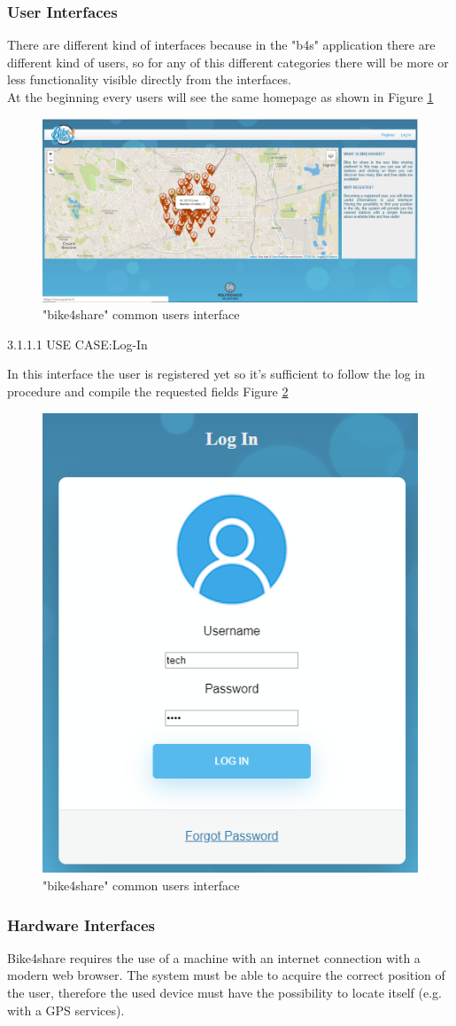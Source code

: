 \documentclass{article}
\begin{document}
\subsubsection{User Interfaces}
There are different kind of interfaces because in the "b4s" application there are different kind of users, so for any of this different categories there will be more or less functionality visible directly from the interfaces.\\
At the beginning every users will see the same homepage as shown in Figure \ref{fig:homepage}\\
\begin{figure}[H]
    \centering
    \includegraphics[width=0.75\linewidth]{image/all.PNG}
    \caption{"bike4share" common users interface}
    \label{fig:homepage}
\end{figure}

3.1.1.1 USE CASE:Log-In

In this interface the user is registered yet so it's sufficient to follow the log in procedure and compile the requested fields Figure \ref{fig:log-in 2}
\begin{figure}[H]
    \centering
    \includegraphics[width=0.35\linewidth]{image/log_in.PNG}
    \caption{"bike4share" common users interface}
    \label{fig:log-in 2}
\end{figure}

\subsubsection{Hardware Interfaces}
Bike4share requires the use of a machine with an internet connection with a modern web browser.
The system must be able to acquire the correct position of the user, therefore the used device must have the possibility to locate itself (e.g. with a GPS services).
\end{document}
